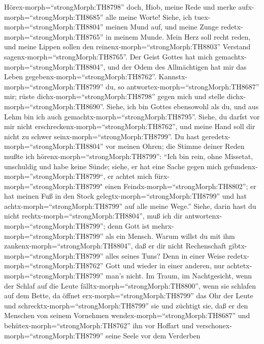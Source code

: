  Hörex-morph=``strongMorph:TH8798'' doch, Hiob, meine Rede
und merke aufx-morph=``strongMorph:TH8685'' alle meine Worte!
 Siehe, ich tuex-morph=``strongMorph:TH8804'' meinen Mund
auf, und meine Zunge redetx-morph=``strongMorph:TH8765'' in meinem
Munde.  Mein Herz soll recht reden, und meine Lippen sollen
den reinenx-morph=``strongMorph:TH8803'' Verstand
sagenx-morph=``strongMorph:TH8765''.  Der Geist Gottes hat
mich gemachtx-morph=``strongMorph:TH8804'', und der Odem des
Allmächtigen hat mir das Leben gegebenx-morph=``strongMorph:TH8762''.
 Kannstx-morph=``strongMorph:TH8799'' du, so
antwortex-morph=``strongMorph:TH8687'' mir; rüste
dichx-morph=``strongMorph:TH8798'' gegen mich und stelle
dichx-morph=``strongMorph:TH8690''.  Siehe, ich bin Gottes
ebensowohl als du, und aus Lehm bin ich auch
gemachtx-morph=``strongMorph:TH8795''.  Siehe, du darfst vor
mir nicht erschreckenx-morph=``strongMorph:TH8762'', und meine Hand soll
dir nicht zu schwer seinx-morph=``strongMorph:TH8799''.  Du
hast geredetx-morph=``strongMorph:TH8804'' vor meinen Ohren; die Stimme
deiner Reden mußte ich hörenx-morph=``strongMorph:TH8799'': 
``Ich bin rein, ohne Missetat, unschuldig und habe keine Sünde;
 siehe, er hat eine Sache gegen mich
gefundenx-morph=''strongMorph:TH8799``, er achtet mich
fürx-morph=''strongMorph:TH8799" einen
Feindx-morph=``strongMorph:TH8802'';  er hat meinen Fuß in
den Stock gelegtx-morph=``strongMorph:TH8799'' und hat
achtx-morph=``strongMorph:TH8799'' auf alle meine Wege.'' 
Siehe, darin hast du nicht rechtx-morph=``strongMorph:TH8804'', muß ich
dir antwortenx-morph=``strongMorph:TH8799''; denn Gott ist
mehrx-morph=``strongMorph:TH8799'' als ein Mensch.  Warum
willst du mit ihm zankenx-morph=``strongMorph:TH8804'', daß er dir nicht
Rechenschaft gibtx-morph=``strongMorph:TH8799'' alles seines Tuns?
 Denn in einer Weise redetx-morph=``strongMorph:TH8762''
Gott und wieder in einer anderen, nur
achtetx-morph=``strongMorph:TH8799'' man's nicht.  Im
Traum, im Nachtgesicht, wenn der Schlaf auf die Leute
fälltx-morph=``strongMorph:TH8800'', wenn sie schlafen auf dem Bette,
 da öffnet erx-morph=``strongMorph:TH8799'' das Ohr der
Leute und schrecktx-morph=``strongMorph:TH8799'' sie und züchtigt sie,
 daß er den Menschen von seinem Vornehmen
wendex-morph=``strongMorph:TH8687'' und
behütex-morph=``strongMorph:TH8762'' ihn vor Hoffart  und
verschonex-morph=``strongMorph:TH8799'' seine Seele vor dem Verderben
